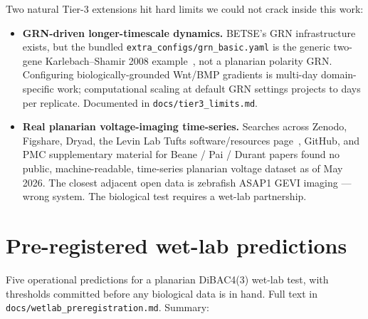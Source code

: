 \documentclass[11pt,a4paper]{article}
\begin{document}
Two natural Tier-3 extensions hit hard limits we could not crack inside this work:

\begin{itemize}\itemsep0pt
\item \textbf{GRN-driven longer-timescale dynamics.} BETSE's GRN infrastructure exists, but the bundled \texttt{extra\_configs/grn\_basic.yaml} is the generic two-gene Karlebach--Shamir 2008 example~\citep{karlebach2008modelling}, not a planarian polarity GRN. Configuring biologically-grounded Wnt/BMP gradients is multi-day domain-specific work; computational scaling at default GRN settings projects to days per replicate. Documented in \texttt{docs/tier3\_limits.md}.
\item \textbf{Real planarian voltage-imaging time-series.} Searches across Zenodo, Figshare, Dryad, the Levin Lab Tufts software/resources page~\citep{levinlab_planaria}, GitHub, and PMC supplementary material for Beane / Pai / Durant papers found no public, machine-readable, time-series planarian voltage dataset as of May 2026. The closest adjacent open data is zebrafish ASAP1 GEVI imaging --- wrong system. The biological test requires a wet-lab partnership.
\end{itemize}

\section{Pre-registered wet-lab predictions}\label{sec:prereg}

Five operational predictions for a planarian DiBAC4(3) wet-lab test, with thresholds committed before any biological data is in hand. Full text in \texttt{docs/wetlab\_preregistration.md}. Summary:
\end{document}
